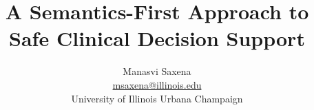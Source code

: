 


\title{A Semantics-First Approach to Safe Clinical Decision Support}
\author{Manasvi Saxena \\
\href{mailto:msaxena2@illinois.edu}{msaxena@illinois.edu} \\
University of Illinois Urbana Champaign}

\date{}
\maketitle

%
% 


%




\newpage




